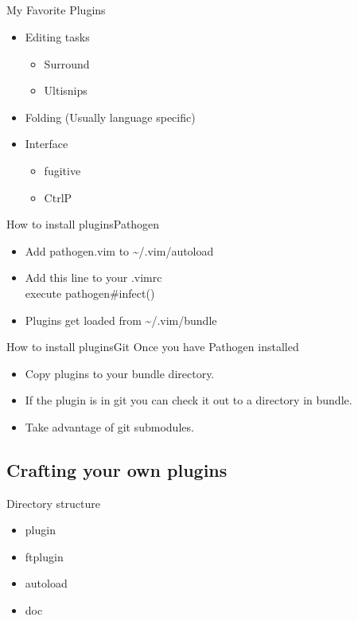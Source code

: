 \documentclass{beamer}
\begin{document}
    \subsection{}
    \begin{frame}{My Favorite Plugins}
        \begin{itemize}
            \item Editing tasks
                \begin{itemize}
                    \item Surround
                    \item Ultisnips
                \end{itemize}
            \item Folding (Usually language specific)
            \item Interface
                \begin{itemize}
                    \item fugitive
                    \item CtrlP
                \end{itemize}
        \end{itemize}
    \end{frame}
    \begin{frame}{How to install plugins}{Pathogen}
        \begin{itemize}
            \item Add pathogen.vim to \textasciitilde/.vim/autoload
            \item Add this line to your .vimrc\\
                \quad execute pathogen\#infect()
            \item Plugins get loaded from \textasciitilde/.vim/bundle
        \end{itemize}
    \end{frame}
    \begin{frame}{How to install plugins}{Git}
        Once you have Pathogen installed
        \begin{itemize}
            \item Copy plugins to your bundle directory.
            \item If the plugin is in git you can check it out to a directory in bundle.
            \item Take advantage of git submodules.
        \end{itemize}
    \end{frame}
    \subsection{Crafting your own plugins}
    \begin{frame}{Directory structure}
        \begin{itemize}
            \item plugin
            \item ftplugin
            \item autoload
            \item doc
        \end{itemize}
    \end{frame}
\end{document}
